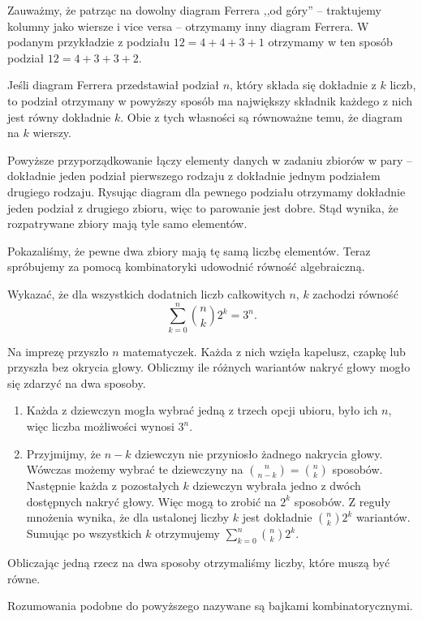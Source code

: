 Zauważmy, że patrząc na dowolny diagram Ferrera ,,od góry'' -- traktujemy kolumny jako wiersze i vice versa -- otrzymamy inny diagram Ferrera. W podanym przykładzie z podziału $12 = 4 + 4 + 3 + 1$ otrzymamy w ten sposób podział $12 = 4 + 3 + 3 + 2$.

Jeśli diagram Ferrera przedstawiał podział $n$, który składa się dokładnie z $k$ liczb, to podział otrzymany w powyższy sposób ma największy składnik każdego z nich jest równy dokładnie $k$. Obie z tych własności są równoważne temu, że diagram na $k$ wierszy.

Powyższe przyporządkowanie łączy elementy danych w zadaniu zbiorów w pary -- dokładnie jeden podział pierwszego rodzaju z dokładnie jednym podziałem drugiego rodzaju. Rysując diagram dla pewnego podziału otrzymamy dokładnie jeden podział z drugiego zbioru, więc to parowanie jest dobre. Stąd wynika, że rozpatrywane zbiory mają tyle samo elementów.

\vspace{10px}

\noindent
Pokazaliśmy, że pewne dwa zbiory mają tę samą liczbę elementów. Teraz spróbujemy za pomocą kombinatoryki udowodnić równość algebraiczną.

\vspace{5px}



\noindent
Wykazać, że dla wszystkich dodatnich liczb całkowitych $n$, $k$ zachodzi równość
\[
    \sum^{n}_{k=0} {{n}\choose{k}} 2^k = 3^n.
\]

\vspace{5px}


\vspace{5px}

\noindent
Na imprezę przyszło $n$ matematyczek. Każda z nich wzięła kapelusz, czapkę lub przyszła bez okrycia głowy. Obliczmy ile różnych wariantów nakryć głowy mogło się zdarzyć na dwa sposoby.
\begin{enumerate}
    \item Każda z dziewczyn mogła wybrać jedną z trzech opcji ubioru, było ich $n$, więc liczba możliwości wynosi $3^n$.
    \item Przyjmijmy, że $n - k$ dziewczyn nie przyniosło żadnego nakrycia głowy. 
    Wówczas możemy wybrać te dziewczyny na ${{n}\choose{n - k}} = {{n}\choose{k}}$ sposobów. 
    Następnie każda z pozostałych $k$ dziewczyn wybrała jedno z dwóch dostępnych nakryć głowy. 
    Więc mogą to zrobić na $2^k$ sposobów. Z reguły mnożenia wynika, że dla ustalonej liczby $k$ jest dokładnie ${{n}\choose{k}} 2^k$ wariantów. Sumując po wszystkich $k$ otrzymujemy $\sum^{n}_{k=0} {{n}\choose{k}} 2^k$.
\end{enumerate}

\noindent
Obliczając jedną rzecz na dwa sposoby otrzymaliśmy liczby, które muszą być równe.

\vspace{10px}

\noindent
Rozumowania podobne do powyższego nazywane są bajkami kombinatorycznymi.

\vspace{10px}